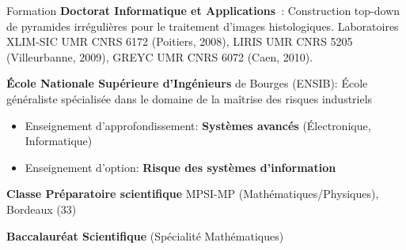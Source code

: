 \begin{rubric}{Formation}
  \textbf{Doctorat Informatique et Applications}~: 
  \og Construction top-down de pyramides irrégulières pour le traitement d'images histologiques\fg. 
  Laboratoires XLIM-SIC UMR CNRS 6172 (Poitiers, 2008), LIRIS UMR CNRS 5205 (Villeurbanne, 2009), GREYC UMR CNRS 6072 (Caen, 2010).

  \textbf{École Nationale Supérieure d'Ingénieurs} de Bourges (ENSIB): 
  École généraliste spécialisée dans le domaine de la maîtrise des risques industriels
  \begin{itemize}
  \item Enseignement d'approfondissement: \textbf{Systèmes avancés} (Électronique, Informatique)
  \item Enseignement d'option: \textbf{Risque des systèmes d'information}
  \end{itemize}

  \textbf{Classe Préparatoire scientifique} MPSI-MP (Mathématiques/Physiques), Bordeaux (33)

  \textbf{Baccalauréat Scientifique} (Spécialité Mathématiques)

\end{rubric}

